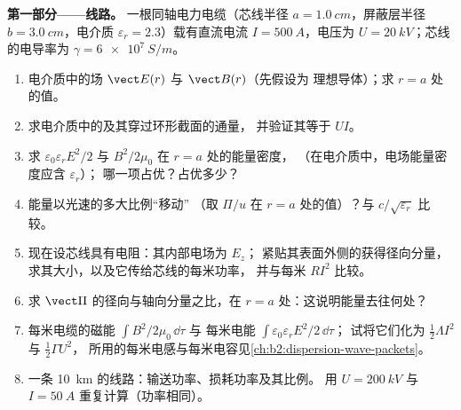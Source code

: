 \begin{problem}
\label{pb:b2:poynting-vector:1}

\medskip
\noindent\textbf{第一部分——线路。}
一根同轴电力电缆（芯线半径 $a = \qty{1.0}{cm}$，屏蔽层半径 $b =
\qty{3.0}{cm}$，电介质 $\varepsilon_r = 2.3$）载有直流电流 $I =
\qty{500}{A}$，电压为 $U = \qty{20}{kV}$；芯线的电导率为 $\gamma =
\qty{6e7}{S/m}$。
\begin{enumerate}
  \item 电介质中的场 $\vect E(r)$ 与 $\vect B(r)$（先假设为
        理想导体）；求 $r = a$ 处的值。
  \item 求电介质中的及其穿过环形截面的通量，
        并验证其等于 $UI$。
  \item 求 $\varepsilon_0\varepsilon_rE^2/2$ 与 $B^2/2\mu_0$ 在 $r = a$ 处的能量密度，
        （在电介质中，电场能量密度应含 $\varepsilon_r$）；
        哪一项占优？占优多少？
  \item 能量以光速的多大比例“移动”
        （取 $\Pi/u$ 在 $r = a$ 处的值）？与 $c/\sqrt{\varepsilon_r}$ 比较。
  \item 现在设芯线具有电阻：其内部电场为 $E_z$；
        紧贴其表面外侧的获得径向分量，
        求其大小，以及它传给芯线的每米功率，
        并与每米 $RI^2$ 比较。
  \item 求 $\vect\Pi$ 的径向与轴向分量之比，在 $r =
        a$ 处：这说明能量去往何处？
  \item 每米电缆的磁能 $\int B^2/2\mu_0\,\dd\tau$ 与
        每米电能 $\int\varepsilon_0\varepsilon_rE^2/2\,\dd\tau$；
        试将它们化为 $\tfrac12\Lambda I^2$ 与 $\tfrac12\Gamma U^2$，
        所用的每米电感与每米电容见\cref{ch:b2:dispersion-wave-packets}。
  \item 一条 \qty{10}{km} 的线路：输送功率、损耗功率及其比例。
        用 $U = \qty{200}{kV}$ 与 $I = \qty{50}{A}$ 重复计算（功率相同）。
\end{enumerate}


\end{problem}
